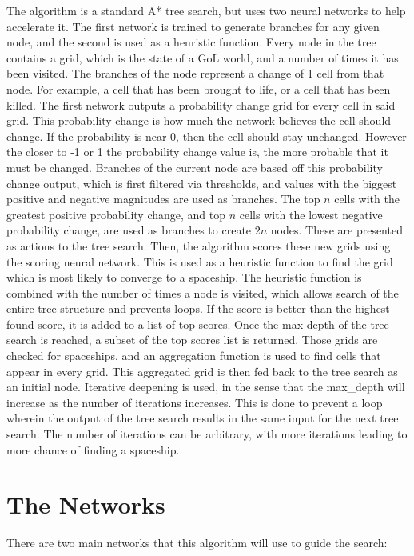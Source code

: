 \documentclass{l4proj}
\begin{document}
The algorithm is a standard A* tree search, but uses two neural networks to help accelerate it. The first network is trained to generate branches for any given node, and the second is used as a heuristic function. Every node in the tree contains a grid, which is the state of a GoL world, and a number of times it has been visited. The branches of the node represent a change of 1 cell from that node. For example, a cell that has been brought to life, or a cell that has been killed. The first network outputs a probability change grid for every cell in said grid. This probability change is how much the network believes the cell should change. If the probability is near 0, then the cell should stay unchanged. However the closer to -1 or 1 the probability change value is, the more probable that it must be changed. Branches of the current node are based off this probability change output, which is first filtered via thresholds, and values with the biggest positive and negative magnitudes are used as branches. The top $n$ cells with the greatest positive probability change, and top $n$ cells with the lowest negative probability change, are used as branches to create $2n$ nodes. These are presented as actions to the tree search. Then, the algorithm scores these new grids using the scoring neural network. This is used as a heuristic function to find the grid which is most likely to converge to a spaceship. The heuristic function is combined with the number of times a node is visited, which allows search of the entire tree structure and prevents loops. If the score is better than the highest found score, it is added to a list of top scores. Once the max depth of the tree search is reached, a subset of the top scores list is returned. Those grids are checked for spaceships, and an aggregation function is used to find cells that appear in every grid. This aggregated grid is then fed back to the tree search as an initial node. Iterative deepening is used, in the sense that the max\_depth will increase as the number of iterations increases. This is done to prevent a loop wherein the output of the tree search results in the same input for the next tree search. The number of iterations can be arbitrary, with more iterations leading to more chance of finding a spaceship.

\section{The Networks}

There are two main networks that this algorithm will use to guide the search:
\end{document}
